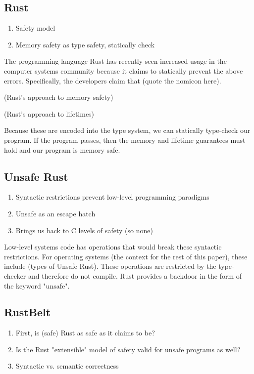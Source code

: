 \documentclass{article}
\begin{document}
\subsection{Rust}
\begin{enumerate}
    \item Safety model
    \item Memory safety as type safety, statically check
\end{enumerate}

The programming language Rust has recently seen increased usage in the computer systems community because it claims to statically prevent the above errors. Specifically, the developers claim that (quote the nomicon here).

(Rust's approach to memory safety)

(Rust's approach to lifetimes)

Because these are encoded into the type system, we can statically type-check our program. If the program passes, then the memory and lifetime guarantees must hold and our program is memory safe.

\subsection{Unsafe Rust}
\begin{enumerate}
    \item Syntactic restrictions prevent low-level programming paradigms
    \item Unsafe as an escape hatch
    \item Brings us back to C levels of safety (so none)
\end{enumerate}

Low-level systems code has operations that would break these syntactic restrictions. For operating systems (the context for the rest of this paper), these include (types of Unsafe Rust). These operations are restricted by the type-checker and therefore do not compile. Rust provides a backdoor in the form of the keyword "unsafe".

\subsection{RustBelt}
\begin{enumerate}
    \item First, is (safe) Rust as safe as it claims to be?
    \item Is the Rust "extensible" model of safety valid for unsafe programs as well?
    \item Syntactic vs. semantic correctness
\end{enumerate}
\end{document}
